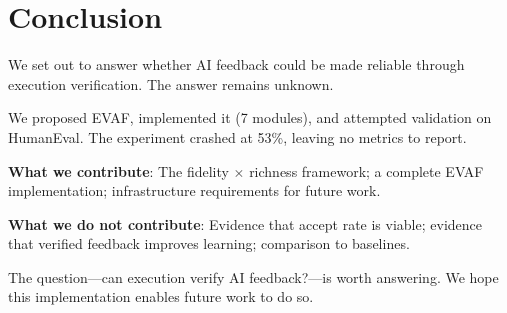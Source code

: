\section{Conclusion}
\label{sec:conclusion}

We set out to answer whether AI feedback could be made reliable through execution verification. The answer remains unknown.

We proposed EVAF, implemented it (7 modules), and attempted validation on HumanEval. The experiment crashed at 53\%, leaving no metrics to report.

\textbf{What we contribute}: The fidelity $\times$ richness framework; a complete EVAF implementation; infrastructure requirements for future work.

\textbf{What we do not contribute}: Evidence that accept rate is viable; evidence that verified feedback improves learning; comparison to baselines.

The question---can execution verify AI feedback?---is worth answering. We hope this implementation enables future work to do so.
